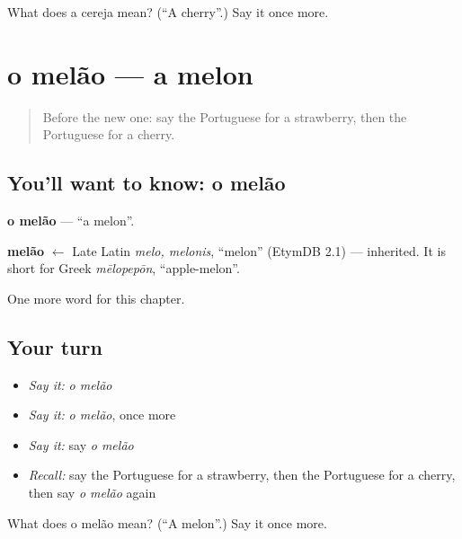 \begin{tcolorbox}[breakable,colback=teal!4,colframe=teal!35!black,title={Before you move on}]
What does a cereja mean? (\textquotedblleft{}A cherry\textquotedblright{}.) Say it once more.
\end{tcolorbox}
\section[o melão]{o melão — a melon}

\label{lesson:PT-C106-melao}



\begin{quote}
Before the new one: say the Portuguese for a strawberry, then the Portuguese for a cherry.
\end{quote}

\subsection*{You'll want to know: o melão}
\textbf{o melão} — \textquotedblleft{}a melon\textquotedblright{}.

\begin{cousinweb}
\textbf{melão} $\leftarrow$ Late Latin \emph{melo, melonis}, \textquotedblleft{}melon\textquotedblright{} (EtymDB 2.1) — inherited. It is short for Greek \emph{mēlopepōn}, \textquotedblleft{}apple-melon\textquotedblright{}.
\end{cousinweb}

\begin{grammarlens}[title={What you've built}]
One more word for this chapter.
\end{grammarlens}

\subsection*{Your turn}
\begin{itemize}
\raggedright
  \item \emph{Say it:} \emph{o melão}
  \item \emph{Say it:} \emph{o melão}, once more
  \item \emph{Say it:} say \emph{o melão}
  \item \emph{Recall:} say the Portuguese for a strawberry, then the Portuguese for a cherry, then say \emph{o melão} again
\end{itemize}

\begin{tcolorbox}[breakable,colback=teal!4,colframe=teal!35!black,title={Before you move on}]
What does o melão mean? (\textquotedblleft{}A melon\textquotedblright{}.) Say it once more.
\end{tcolorbox}
